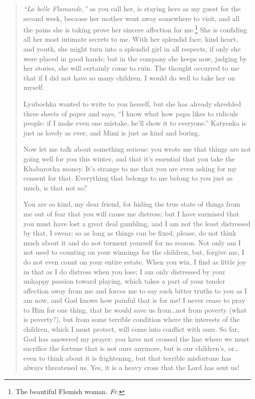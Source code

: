 \begin{quotation}
\textit{``La belle Flamande,''} as you call her, is staying here as my guest for the second week, because her mother went away somewhere to visit, and all the pains she is taking prove her sincere affection for me.\footnote{The beautiful Flemish woman. \textit{Fr.}} She is confiding all her most intimate secrets to me. With her splendid face, kind heart, and youth, she might turn into a splendid girl in all respects, if only she were placed in good hands; but in the company she keeps now, judging by her stories, she will certainly come to ruin. The thought occurred to me that if I did not have so many children, I would do well to take her on myself.

Lyubochka wanted to write to you herself, but she has already shredded three sheets of paper and says, ``I know what how papa likes to ridicule people: if I make even one mistake, he'll show it to everyone.'' Katyenka is just as lovely as ever, and Mimi is just as kind and boring.

Now let me talk about something serious: you wrote me that things are not going well for you this winter, and that it's essential that you take the Khabarovka money. It's strange to me that you are even asking for my consent for that. Everything that belongs to me belong to you just as much, is that not so?

You are so kind, my dear friend, for hiding the true state of things from me out of fear that you will cause me distress; but I have surmised that you must have lost a great deal gambling, and I am not the least distressed by that, I swear; so as long as things can be fixed, please, do not think much about it and do not torment yourself for no reason. Not only am I not used to counting on your winnings for the children, but, forgive me, I do not even count on your entire estate. When you win, I find as little joy in that as I do distress when you lose; I am only distressed by your unhappy passion toward playing, which takes a part of your tender affection away from me and forces me to say such bitter truths to you as I am now, and God knows how painful that is for me! I never cease to pray to Him for one thing, that he would save us from\ldots{}not from poverty (what is poverty?), but from some terrible condition where the interests of the children, which I must protect, will come into conflict with ours. So far, God has answered my prayer: you have not crossed the line where we must sacrifice the fortune that is not ours anymore, but is our children's, or\ldots{}even to think about it is frightening, but that terrible misfortune has always threatened us. Yes, it is a heavy cross that the Lord has sent us!


\end{quotation}
